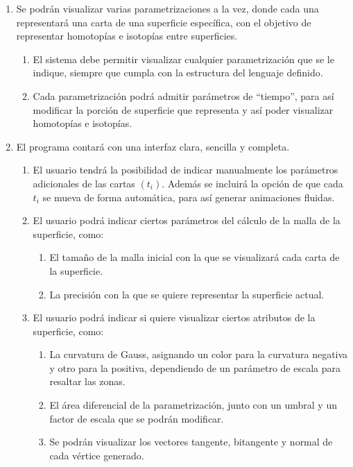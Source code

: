 	\begin{enumerate}
		\item Se podrán visualizar varias parametrizaciones a la vez, donde cada una representará una carta de una superficie específica, con el objetivo de representar homotopías e isotopías entre superficies.
		\begin{enumerate}
			\item El sistema debe permitir visualizar cualquier parametrización que se le indique, siempre que cumpla con la estructura del lenguaje definido.
			\item Cada parametrización podrá admitir parámetros de ``tiempo'', para así modificar la porción de superficie que representa y así poder visualizar homotopías e isotopías.
		\end{enumerate}
		
		\item El programa contará con una interfaz clara, sencilla y completa.
		\begin{enumerate}
			\item El usuario tendrá la posibilidad de indicar manualmente los parámetros adicionales de las cartas $(t_i)$. Además se incluirá la opción de que cada $t_i$ se mueva de forma automática, para así generar animaciones fluidas.
			
			\item El usuario podrá indicar ciertos parámetros del cálculo de la malla de la superficie, como:
			\begin{enumerate}
				\item El tamaño de la malla inicial con la que se visualizará cada carta de la superficie.
				\item La precisión con la que se quiere representar la superficie actual.
			\end{enumerate}
				
			\item El usuario podrá indicar si quiere visualizar ciertos atributos de la superficie, como:
			\begin{enumerate}
				\item La curvatura de Gauss, asignando un color para la curvatura negativa y otro para la positiva, dependiendo de un parámetro de escala para resaltar las zonas.
				\item El área diferencial de la parametrización, junto con un umbral y un factor de escala que se podrán modificar.
				\item Se podrán visualizar los vectores tangente, bitangente y normal de cada vértice generado.
			\end{enumerate}
			

\end{enumerate}
\end{enumerate}

